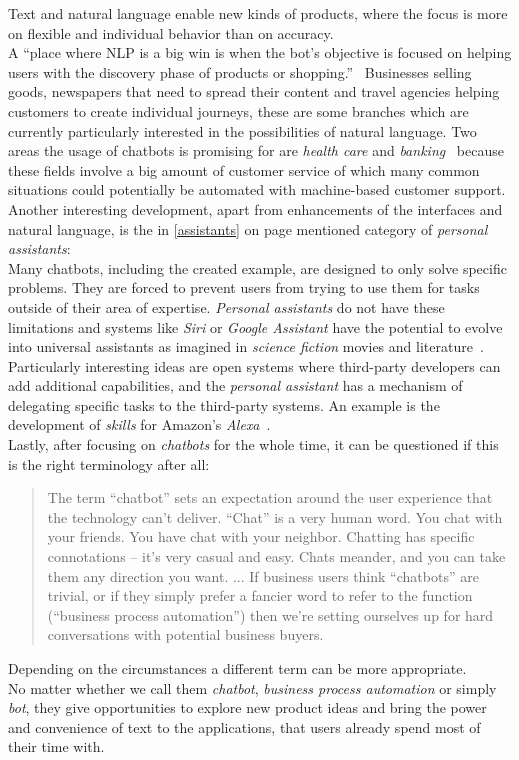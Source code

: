 Text and natural language enable new kinds of products, where the focus is more on flexible and individual behavior than on accuracy.
\\
A ``place where NLP is a big win is when the bot’s objective is focused on helping users with the discovery phase of products or shopping.''~\cite{neednlp}
Businesses selling goods, newspapers that need to spread their content and travel agencies helping customers to create individual journeys,
these are some branches which are currently particularly interested in the possibilities of natural language.
Two areas the usage of chatbots is promising for are \emph{health care} and \emph{banking}~\cite{botlist}
because these fields involve a big amount of customer service of which many common situations could potentially be automated with machine-based customer support.
\\

Another interesting development, apart from enhancements of the interfaces and natural language, is the in \ref{assistants} on page \pageref{assistants} mentioned category of \emph{personal assistants}:
\\
Many chatbots, including the created example, are designed to only solve specific problems.
They are forced to prevent users from trying to use them for tasks outside of their area of expertise.
\emph{Personal assistants} do not have these limitations
and systems like \emph{Siri} or \emph{Google Assistant} have the potential to evolve into universal assistants as imagined in \emph{science fiction} movies and literature~\cite{assistant}.
\\
Particularly interesting ideas are open systems where third-party developers can add additional capabilities,
and the \emph{personal assistant} has a mechanism of delegating specific tasks to the third-party systems.
An example is the development of \emph{skills} for Amazon's \emph{Alexa}~\cite{alexa}.
\\

Lastly, after focusing on \emph{chatbots} for the whole time,
it can be questioned if this is the right terminology after all:

\begin{quote}
The term “chatbot” sets an expectation around the user experience that the technology can’t deliver.
“Chat” is a very human word.
You chat with your friends.
You have chat with your neighbor.
Chatting has specific connotations – it’s very casual and easy.
Chats meander, and you can take them any direction you want.
...
If business users think “chatbots” are trivial, or if they simply prefer a fancier word to refer to the function (“business process automation”) then we’re setting ourselves up for hard conversations with potential business buyers.~\cite{botnerds}
\end{quote}

Depending on the circumstances a different term can be more appropriate.
\\
No matter whether we call them \emph{chatbot}, \emph{business process automation} or simply \emph{bot},
they give opportunities to explore new product ideas and bring the power and convenience of text to the applications, that users already spend most of their time with.
